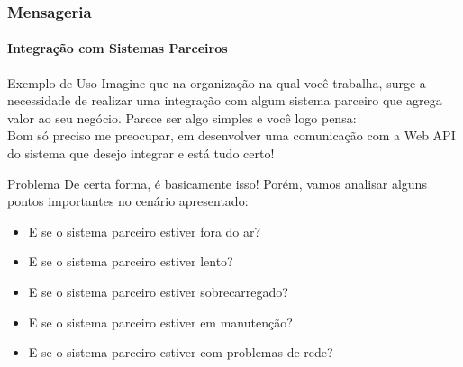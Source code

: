 \documentclass[
	9pt, %
	t, %
]{beamer}
\begin{document}
\begin{frame}
	\frametitle{Mensageria}
	\framesubtitle{Integração com Sistemas Parceiros}

	\begin{block}{Exemplo de Uso}
		Imagine que na organização na qual você trabalha, surge a necessidade de realizar uma integração com algum sistema parceiro que agrega valor ao seu negócio. Parece ser algo simples e você logo pensa:
		\\ \bigskip
		\alert{Bom só preciso me preocupar, em desenvolver uma comunicação com a Web API do sistema que desejo integrar e está tudo certo!}

	\end{block}

	\begin{block}{Problema}
		De certa forma, é basicamente isso! Porém, vamos analisar alguns pontos importantes no cenário apresentado:
		\begin{itemize}
			\item E se o sistema parceiro estiver fora do ar?
			\item E se o sistema parceiro estiver lento?
			\item E se o sistema parceiro estiver sobrecarregado?
			\item E se o sistema parceiro estiver em manutenção?
			\item E se o sistema parceiro estiver com problemas de rede?
		\end{itemize}
	\end{block}

\end{frame}
\end{document}
